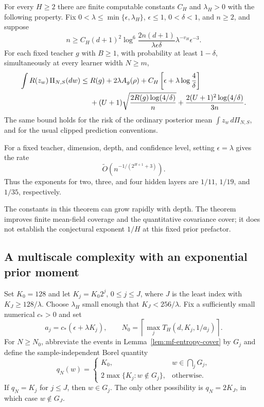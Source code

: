 \begin{theorem}
\label{thm:fixed-meanfield-raw}
For every $H\ge2$ there are finite computable constants $C_H$ and
$\lambda_H>0$ with the following property.  Fix
$0<\lambda\le\min\{\epsilon,\lambda_H\}$, $\epsilon\le1$,
$0<\delta<1$, and $n\ge2$, and suppose
\begin{equation}\label{eq:mf-two-parameter-budget}
 n\ge C_H(d+1)^2
 \log^6\!\frac{2n(d+1)}{\lambda\epsilon\delta}
 \lambda^{-v_H}\epsilon^{-3}.
\end{equation}
For each fixed teacher $g$ with $B\ge1$, with probability at least
$1-\delta$, simultaneously at every learner width $N\ge m$,
\begin{align}
 \int R(z_w)\,\Pi_{N,S}(dw)
 \le\;&R(g)+2\lambda A_g(\rho)
       +C_H\left[\epsilon+\lambda\log\frac4\delta\right]
 \notag\\
 &+(U+1)\sqrt{\frac{2R(g)\log(4/\delta)}n}
       +\frac{2(U+1)^2\log(4/\delta)}{3n}.
 \label{eq:mf-raw-oracle}
\end{align}
The same bound holds for the risk of the ordinary posterior mean
$\int z_w\,d\Pi_{N,S}$, and for the usual clipped prediction
conventions.

For a fixed teacher, dimension, depth, and confidence level, setting
$\epsilon=\lambda$ gives the rate
\begin{equation}\label{eq:mf-raw-rate}
 \widetilde O\!\left(n^{-1/(2^{H+1}+3)}\right).
\end{equation}
Thus the exponents for two, three, and four hidden layers are
$1/11$, $1/19$, and $1/35$, respectively.
\end{theorem}

The constants in this theorem can grow rapidly with depth.  The theorem
improves finite mean-field coverage and the quantitative covariance
cover; it does not establish the conjectural exponent $1/H$ at this
fixed prior prefactor.

\subsection{A multiscale complexity with an exponential prior moment}

Set $K_0=128$ and let $K_j=K_0 2^j$, $0\le j\le J$, where $J$ is the least index with
$K_J\ge128/\lambda$.  Choose $\lambda_H$ small enough that
$K_J<256/\lambda$.  Fix a sufficiently small numerical $c_*>0$ and set
\[
 a_j=c_*(\epsilon+\lambda K_j),\qquad
 N_0=\left\lceil\max_j T_H(d,K_j,1/a_j)\right\rceil.
\]
For $N\ge N_0$, abbreviate the events in Lemma~\ref{lem:mf-entropy-cover}
by $G_j$ and define the sample-independent Borel quantity
\[
 q_N(w)=
 \begin{cases}
 K_0,&w\in\bigcap_jG_j,\\
 2\max\{K_j:w\notin G_j\},&\text{otherwise}.
 \end{cases}
\]
If $q_N=K_j$ for $j\le J$, then $w\in G_j$.  The only other
possibility is $q_N=2K_J$, in which case $w\notin G_J$.

